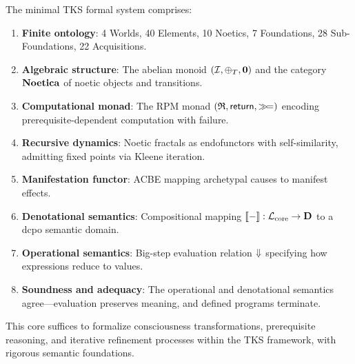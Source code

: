 \begin{tcolorbox}[colback=gray!5!white,colframe=gray!75!black,title=\textbf{Summary: The TKS Core Calculus},breakable]
The minimal TKS formal system comprises:
\begin{enumerate}
    \item \textbf{Finite ontology}: 4 Worlds, 40 Elements, 10 Noetics, 7 Foundations,
          28 Sub-Foundations, 22 Acquisitions.
    \item \textbf{Algebraic structure}: The abelian monoid $(\mathcal{I}, \oplus_T, \mathbf{0})$
          and the category $\mathbf{Noetica}$ of noetic objects and transitions.
    \item \textbf{Computational monad}: The RPM monad $(\mathfrak{R}, \mathsf{return}, \mathbin{\gg\!=})$ encoding
          prerequisite-dependent computation with failure.
    \item \textbf{Recursive dynamics}: Noetic fractals as endofunctors with self-similarity,
          admitting fixed points via Kleene iteration.
    \item \textbf{Manifestation functor}: ACBE mapping archetypal causes to manifest effects.
    \item \textbf{Denotational semantics}: Compositional mapping $\llbracket - \rrbracket : \mathcal{L}_{\mathrm{core}} \to \mathbf{D}$
          to a dcpo semantic domain.
    \item \textbf{Operational semantics}: Big-step evaluation relation $\Downarrow$ specifying
          how expressions reduce to values.
    \item \textbf{Soundness and adequacy}: The operational and denotational semantics agree---evaluation
          preserves meaning, and defined programs terminate.
\end{enumerate}
This core suffices to formalize consciousness transformations, prerequisite reasoning,
and iterative refinement processes within the TKS framework, with rigorous semantic foundations.
\end{tcolorbox}

